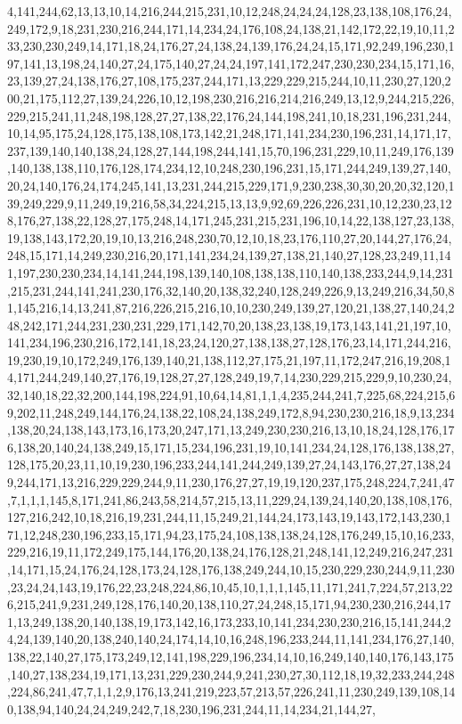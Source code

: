 4,141,244,62,13,13,10,14,216,244,215,231,10,12,248,24,24,24,128,23,138,108,176,24,249,172,9,18,231,230,216,244,171,14,234,24,176,108,24,138,21,142,172,22,19,10,11,233,230,230,249,14,171,18,24,176,27,24,138,24,139,176,24,24,15,171,92,249,196,230,197,141,13,198,24,140,27,24,175,140,27,24,24,197,141,172,247,230,230,234,15,171,16,23,139,27,24,138,176,27,108,175,237,244,171,13,229,229,215,244,10,11,230,27,120,200,21,175,112,27,139,24,226,10,12,198,230,216,216,214,216,249,13,12,9,244,215,226,229,215,241,11,248,198,128,27,27,138,22,176,24,144,198,241,10,18,231,196,231,244,10,14,95,175,24,128,175,138,108,173,142,21,248,171,141,234,230,196,231,14,171,17,237,139,140,140,138,24,128,27,144,198,244,141,15,70,196,231,229,10,11,249,176,139,140,138,138,110,176,128,174,234,12,10,248,230,196,231,15,171,244,249,139,27,140,20,24,140,176,24,174,245,141,13,231,244,215,229,171,9,230,238,30,30,20,20,32,120,139,249,229,9,11,249,19,216,58,34,224,215,13,13,9,92,69,226,226,231,10,12,230,23,128,176,27,138,22,128,27,175,248,14,171,245,231,215,231,196,10,14,22,138,127,23,138,19,138,143,172,20,19,10,13,216,248,230,70,12,10,18,23,176,110,27,20,144,27,176,24,248,15,171,14,249,230,216,20,171,141,234,24,139,27,138,21,140,27,128,23,249,11,141,197,230,230,234,14,141,244,198,139,140,108,138,138,110,140,138,233,244,9,14,231,215,231,244,141,241,230,176,32,140,20,138,32,240,128,249,226,9,13,249,216,34,50,81,145,216,14,13,241,87,216,226,215,216,10,10,230,249,139,27,120,21,138,27,140,24,248,242,171,244,231,230,231,229,171,142,70,20,138,23,138,19,173,143,141,21,197,10,141,234,196,230,216,172,141,18,23,24,120,27,138,138,27,128,176,23,14,171,244,216,19,230,19,10,172,249,176,139,140,21,138,112,27,175,21,197,11,172,247,216,19,208,14,171,244,249,140,27,176,19,128,27,27,128,249,19,7,14,230,229,215,229,9,10,230,24,32,140,18,22,32,200,144,198,224,91,10,64,14,81,1,1,4,235,244,241,7,225,68,224,215,69,202,11,248,249,144,176,24,138,22,108,24,138,249,172,8,94,230,230,216,18,9,13,234,138,20,24,138,143,173,16,173,20,247,171,13,249,230,230,216,13,10,18,24,128,176,176,138,20,140,24,138,249,15,171,15,234,196,231,19,10,141,234,24,128,176,138,138,27,128,175,20,23,11,10,19,230,196,233,244,141,244,249,139,27,24,143,176,27,27,138,249,244,171,13,216,229,229,244,9,11,230,176,27,27,19,19,120,237,175,248,224,7,241,47,7,1,1,1,145,8,171,241,86,243,58,214,57,215,13,11,229,24,139,24,140,20,138,108,176,127,216,242,10,18,216,19,231,244,11,15,249,21,144,24,173,143,19,143,172,143,230,171,12,248,230,196,233,15,171,94,23,175,24,108,138,138,24,128,176,249,15,10,16,233,229,216,19,11,172,249,175,144,176,20,138,24,176,128,21,248,141,12,249,216,247,231,14,171,15,24,176,24,128,173,24,128,176,138,249,244,10,15,230,229,230,244,9,11,230,23,24,24,143,19,176,22,23,248,224,86,10,45,10,1,1,1,145,11,171,241,7,224,57,213,226,215,241,9,231,249,128,176,140,20,138,110,27,24,248,15,171,94,230,230,216,244,171,13,249,138,20,140,138,19,173,142,16,173,233,10,141,234,230,230,216,15,141,244,24,24,139,140,20,138,240,140,24,174,14,10,16,248,196,233,244,11,141,234,176,27,140,138,22,140,27,175,173,249,12,141,198,229,196,234,14,10,16,249,140,140,176,143,175,140,27,138,234,19,171,13,231,229,230,244,9,241,230,27,30,112,18,19,32,233,244,248,224,86,241,47,7,1,1,2,9,176,13,241,219,223,57,213,57,226,241,11,230,249,139,108,140,138,94,140,24,24,249,242,7,18,230,196,231,244,11,14,234,21,144,27,
